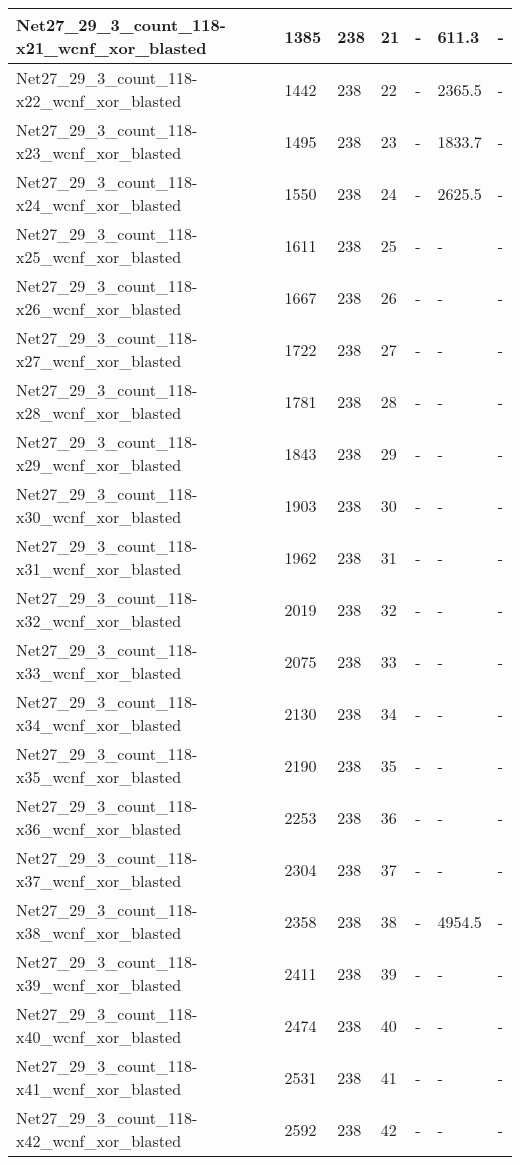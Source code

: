 \begin{scriptsize}
\begin{longtable}{|p{5cm}|l|l|l|l|l|l|}
Net27\_29\_3\_count\_118-x21\_wcnf\_xor\_blasted&1385&238&21&-&611.3&- \\ \hline 
Net27\_29\_3\_count\_118-x22\_wcnf\_xor\_blasted&1442&238&22&-&2365.5&- \\ \hline 
Net27\_29\_3\_count\_118-x23\_wcnf\_xor\_blasted&1495&238&23&-&1833.7&- \\ \hline 
Net27\_29\_3\_count\_118-x24\_wcnf\_xor\_blasted&1550&238&24&-&2625.5&- \\ \hline 
Net27\_29\_3\_count\_118-x25\_wcnf\_xor\_blasted&1611&238&25&-&-&- \\ \hline 
Net27\_29\_3\_count\_118-x26\_wcnf\_xor\_blasted&1667&238&26&-&-&- \\ \hline 
Net27\_29\_3\_count\_118-x27\_wcnf\_xor\_blasted&1722&238&27&-&-&- \\ \hline 
Net27\_29\_3\_count\_118-x28\_wcnf\_xor\_blasted&1781&238&28&-&-&- \\ \hline 
Net27\_29\_3\_count\_118-x29\_wcnf\_xor\_blasted&1843&238&29&-&-&- \\ \hline 
Net27\_29\_3\_count\_118-x30\_wcnf\_xor\_blasted&1903&238&30&-&-&- \\ \hline 
Net27\_29\_3\_count\_118-x31\_wcnf\_xor\_blasted&1962&238&31&-&-&- \\ \hline 
Net27\_29\_3\_count\_118-x32\_wcnf\_xor\_blasted&2019&238&32&-&-&- \\ \hline 
Net27\_29\_3\_count\_118-x33\_wcnf\_xor\_blasted&2075&238&33&-&-&- \\ \hline 
Net27\_29\_3\_count\_118-x34\_wcnf\_xor\_blasted&2130&238&34&-&-&- \\ \hline 
Net27\_29\_3\_count\_118-x35\_wcnf\_xor\_blasted&2190&238&35&-&-&- \\ \hline 
Net27\_29\_3\_count\_118-x36\_wcnf\_xor\_blasted&2253&238&36&-&-&- \\ \hline 
Net27\_29\_3\_count\_118-x37\_wcnf\_xor\_blasted&2304&238&37&-&-&- \\ \hline 
Net27\_29\_3\_count\_118-x38\_wcnf\_xor\_blasted&2358&238&38&-&4954.5&- \\ \hline 
Net27\_29\_3\_count\_118-x39\_wcnf\_xor\_blasted&2411&238&39&-&-&- \\ \hline 
Net27\_29\_3\_count\_118-x40\_wcnf\_xor\_blasted&2474&238&40&-&-&- \\ \hline 
Net27\_29\_3\_count\_118-x41\_wcnf\_xor\_blasted&2531&238&41&-&-&- \\ \hline 
Net27\_29\_3\_count\_118-x42\_wcnf\_xor\_blasted&2592&238&42&-&-&- \\ \hline 

\end{longtable}
\end{scriptsize}
